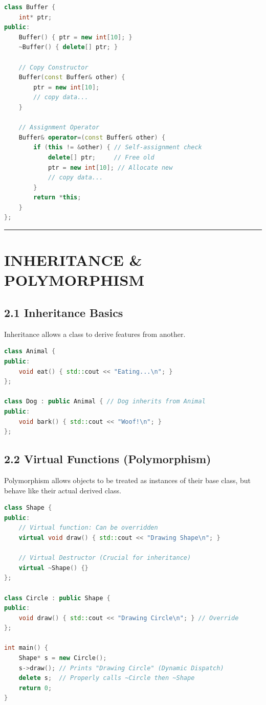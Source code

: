 \begin{lstlisting}[language={C++}]
class Buffer {
    int* ptr;
public:
    Buffer() { ptr = new int[10]; }
    ~Buffer() { delete[] ptr; }

    // Copy Constructor
    Buffer(const Buffer& other) {
        ptr = new int[10];
        // copy data...
    }

    // Assignment Operator
    Buffer& operator=(const Buffer& other) {
        if (this != &other) { // Self-assignment check
            delete[] ptr;     // Free old
            ptr = new int[10]; // Allocate new
            // copy data...
        }
        return *this;
    }
};
\end{lstlisting}

\begin{center}\rule{0.5\linewidth}{0.5pt}\end{center}

\hypertarget{inheritance-polymorphism}{%
\section{INHERITANCE \& POLYMORPHISM}\label{inheritance-polymorphism}}

\hypertarget{inheritance-basics}{%
\subsection{2.1 Inheritance Basics}\label{inheritance-basics}}

Inheritance allows a class to derive features from another.

\begin{lstlisting}[language={C++}]
class Animal {
public:
    void eat() { std::cout << "Eating...\n"; }
};

class Dog : public Animal { // Dog inherits from Animal
public:
    void bark() { std::cout << "Woof!\n"; }
};
\end{lstlisting}

\hypertarget{virtual-functions-polymorphism}{%
\subsection{2.2 Virtual Functions
(Polymorphism)}\label{virtual-functions-polymorphism}}

Polymorphism allows objects to be treated as instances of their base
class, but behave like their actual derived class.

\begin{lstlisting}[language={C++}]
class Shape {
public:
    // Virtual function: Can be overridden
    virtual void draw() { std::cout << "Drawing Shape\n"; }
    
    // Virtual Destructor (Crucial for inheritance)
    virtual ~Shape() {} 
};

class Circle : public Shape {
public:
    void draw() { std::cout << "Drawing Circle\n"; } // Override
};

int main() {
    Shape* s = new Circle();
    s->draw(); // Prints "Drawing Circle" (Dynamic Dispatch)
    delete s;  // Properly calls ~Circle then ~Shape
    return 0;
}
\end{lstlisting}


